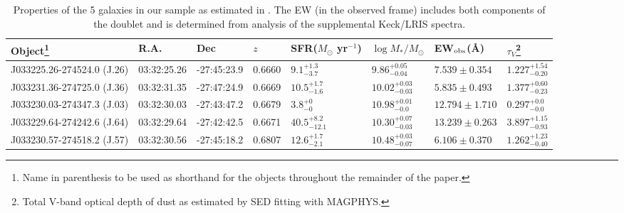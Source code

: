 \documentclass[twocolumn]{aastex61}
\begin{document}
\begin{table}[t]
\centering
\caption{Properties of the 5 galaxies in our sample as estimated in \cite{Rubin_2014}. The EW (in the observed frame) includes both components of the  doublet and is 
determined from analysis of the supplemental Keck/LRIS spectra.}
\begin{tabular}{llllllll} \hline \hline
Object\footnote{ Name in parenthesis to be used as shorthand for the objects throughout the remainder of the paper. } & R.A. & Dec  & $z$ & SFR($M_{\odot}$ yr$^{-1}$) & $\log{M_{*}/M_{\odot}}$ & EW$_{\rm{obs}}$(\AA) & $\tau_V$\footnote{ Total V-band optical depth of dust as estimated by SED fitting with MAGPHYS. }\smallskip      \\ \hline 
J033225.26-274524.0 (J.26)      & 03:32:25.26 & -27:45:23.9 & 0.6660 & $9.1_{-3.7}^{+1.3}$& $9.86_{-0.04}^{+0.05}$ & $7.539\pm 0.354$ &  $1.227_{-0.20}^{+1.54}$\\ 

J033231.36-274725.0 (J.36)      & 03:32:31.35 & -27:47:24.9 &   0.6669 & $10.5_{-1.6}^{+1.7}$ & $10.02_{-0.03}^{+0.03}$&$5.835 \pm 0.493$ & $1.377_{-0.23}^{+0.60}$\\

J033230.03-274347.3  (J.03)     & 03:32:30.03 & -27:43:47.2  &   0.6679 & $3.8_{-0}^{+0}$ & $10.98_{-0.0}^{+0.01}$ &$12.794 \pm 1.710$ & $0.297_{-0.0}^{+0.0}$ \\

J033229.64-274242.6  (J.64)    & 03:32:29.64 & -27:42:42.5 & 0.6671 & $40.5_{-12.1}^{+8.2}$ & $10.30_{-0.03}^{+0.07}$ &$13.239 \pm 0.263$ & $3.897_{-0.93}^{+1.15}$\\

J033230.57-274518.2  (J.57)    & 03:32:30.56 & -27:45:18.2 &   0.6807  & $12.6_{-2.1}^{+1.7}$ & $10.48_{-0.07}^{+0.03}$ &$6.106 \pm 0.370$ & $1.262_{-0.40}^{+1.23}$ \\

\hline 
\end{tabular}
\label{tab:prop}
\end{table}
\end{document}
